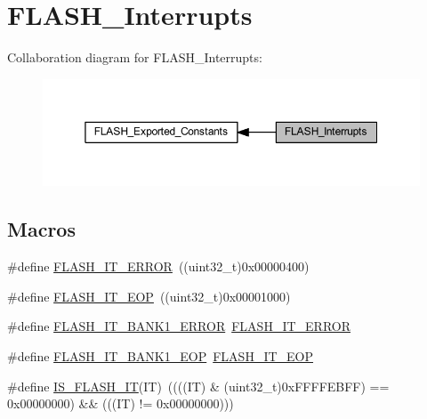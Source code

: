 \hypertarget{group___f_l_a_s_h___interrupts}{}\section{F\+L\+A\+S\+H\+\_\+\+Interrupts}
\label{group___f_l_a_s_h___interrupts}
Collaboration diagram for F\+L\+A\+S\+H\+\_\+\+Interrupts\+:
\nopagebreak
\begin{figure}[H]
\begin{center}
\leavevmode
\includegraphics[width=350pt]{group___f_l_a_s_h___interrupts}
\end{center}
\end{figure}
\subsection*{Macros}
\begin{DoxyCompactItemize}
\item 
\#define \hyperlink{group___f_l_a_s_h___interrupts_ga61c74493d4c1f36ddaf563719d446a7d}{F\+L\+A\+S\+H\+\_\+\+I\+T\+\_\+\+E\+R\+R\+OR}~((uint32\+\_\+t)0x00000400)
\item 
\#define \hyperlink{group___f_l_a_s_h___interrupts_gaea20e80e1806d58a7544cfe8659e7f11}{F\+L\+A\+S\+H\+\_\+\+I\+T\+\_\+\+E\+OP}~((uint32\+\_\+t)0x00001000)
\item 
\#define \hyperlink{group___f_l_a_s_h___interrupts_ga808627239be1bf9c2d8bfed36ec4db19}{F\+L\+A\+S\+H\+\_\+\+I\+T\+\_\+\+B\+A\+N\+K1\+\_\+\+E\+R\+R\+OR}~\hyperlink{group___f_l_a_s_h___interrupts_ga61c74493d4c1f36ddaf563719d446a7d}{F\+L\+A\+S\+H\+\_\+\+I\+T\+\_\+\+E\+R\+R\+OR}
\item 
\#define \hyperlink{group___f_l_a_s_h___interrupts_gac8825e2ce2c0e6ca63a40a347bd351a9}{F\+L\+A\+S\+H\+\_\+\+I\+T\+\_\+\+B\+A\+N\+K1\+\_\+\+E\+OP}~\hyperlink{group___f_l_a_s_h___interrupts_gaea20e80e1806d58a7544cfe8659e7f11}{F\+L\+A\+S\+H\+\_\+\+I\+T\+\_\+\+E\+OP}
\item 
\#define \hyperlink{group___f_l_a_s_h___interrupts_ga46ee77d0be1f3e0a14ded0651163ae11}{I\+S\+\_\+\+F\+L\+A\+S\+H\+\_\+\+IT}(IT)~((((IT) \& (uint32\+\_\+t)0x\+F\+F\+F\+F\+E\+B\+F\+F) == 0x00000000) \&\& (((\+I\+T) != 0x00000000)))
\end{DoxyCompactItemize}


